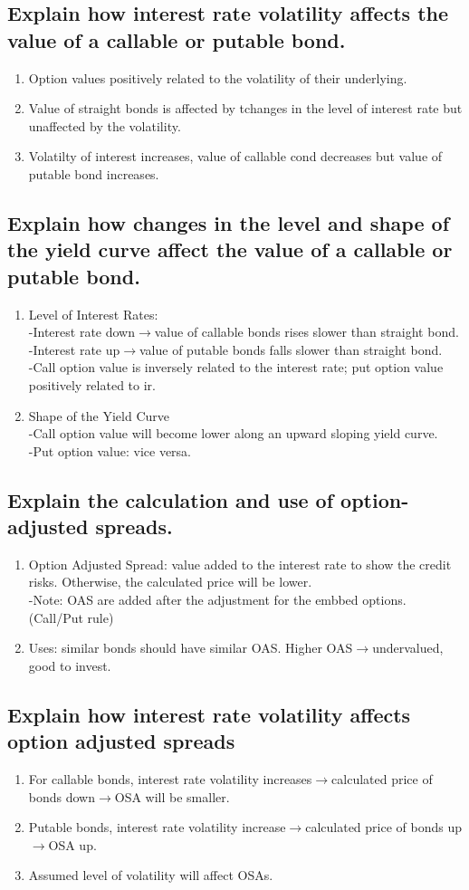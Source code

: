 \documentclass{article}
\newcommand{\be}{\begin{enumerate}}
\newcommand{\ee}{\end{enumerate}}
\newcommand{\ra}{$\rightarrow$}
\begin{document}
\subsection{Explain how interest rate volatility affects the value of a callable 
or putable bond.}
\be
    \item Option values positively related to the volatility of their underlying.
    \item Value of straight bonds is affected by tchanges in the level of interest rate 
    but unaffected by the volatility.
    \item Volatilty of interest increases, value of callable cond decreases but value of putable bond
    increases.
\ee
\subsection{Explain how changes in the level and shape of the yield curve affect the value 
of a callable or putable bond.}
\be
    \item Level of Interest Rates: 
        \\-Interest rate down\ra value of callable bonds rises slower than straight bond.
        \\-Interest rate up\ra value of putable bonds falls slower than straight bond.
        \\-Call option value is inversely related to the interest rate; put option value positively related to ir.
    \item Shape of the Yield Curve
        \\-Call option value will become lower along an upward sloping yield curve.
        \\-Put option value: vice versa.
\ee
\subsection{Explain the calculation and use of option-adjusted spreads.}
\be
    \item Option Adjusted Spread: value added to the interest rate to show the credit risks. 
    Otherwise, the calculated price will be lower.
        \\-Note: OAS are added after the adjustment for the embbed options. (Call/Put rule)
    \item Uses: similar bonds should have similar OAS. Higher OAS\ra undervalued, good to invest.
\ee
\subsection{Explain how interest rate volatility affects option adjusted spreads}
 \be
     \item For callable bonds, interest rate volatility increases\ra calculated price of bonds
     down\ra OSA will be smaller.
     \item Putable bonds, interest rate volatility increase\ra calculated price of bonds 
     up\ra OSA up.
     \item Assumed level of volatility will affect OSAs. 
 \ee
\end{document}
